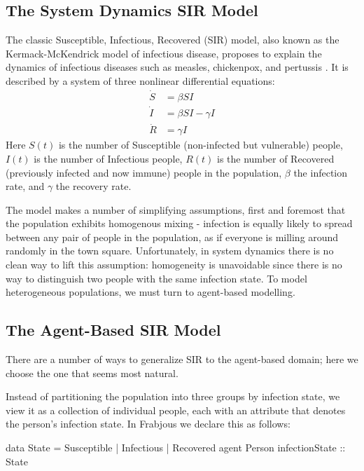 \documentclass{llncs}
\begin{document}
\subsection{The System Dynamics SIR Model}
			
The classic Susceptible, Infectious, Recovered (SIR) model, also known as the Kermack-McKendrick model of infectious disease, proposes to explain the dynamics of infectious diseases such as measles, chickenpox, and pertussis \cite{sir}. It is described by a system of three nonlinear differential equations: 
\begin{align}
     \dot{S} &= \beta S I\\
     \dot{I} &= \beta S I - \gamma I\\
     \dot{R} &= \gamma  I
\end{align}
Here $S(t)$ is the number of Susceptible (non-infected but vulnerable) people, $I(t)$ is the number of Infectious people, $R(t)$ is the number of Recovered (previously infected and now immune) people in the population, $\beta$ the infection rate, and $\gamma$ the recovery rate.  

 The model makes a number of simplifying assumptions, first and foremost that the population exhibits homogenous mixing - infection is equally likely to spread between any pair of people in the population, as if everyone is milling around randomly in the town square. Unfortunately, in system dynamics there is no clean way to lift this assumption: homogeneity is unavoidable since there is no way to distinguish two people with the same infection state. To model heterogeneous populations, we must turn to agent-based modelling. 



\subsection{The Agent-Based SIR Model}

There are a number of ways to generalize SIR to the agent-based domain; here we choose the one that seems most natural. 

 Instead of partitioning the population into three groups by infection state, we view it as a collection of individual people, each with an attribute that denotes the person's infection state. In Frabjous we declare this as follows: 
\begin{code}
data State = Susceptible | Infectious | Recovered 
agent Person { infectionState :: State} 
\end{code}
\end{document}
